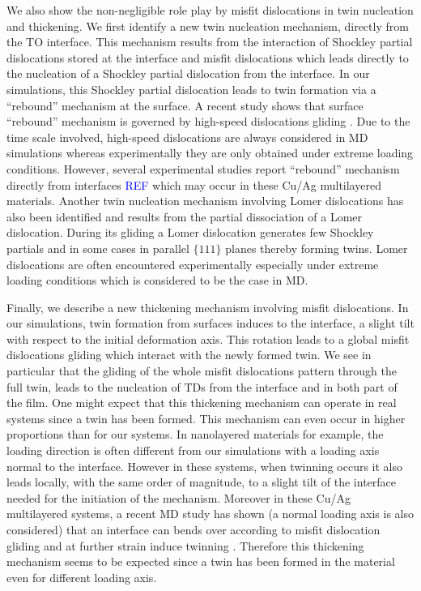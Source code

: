 \documentclass[final,3p,times,twocolumn]{elsarticle}
\begin{document}
We also show the non-negligible role play by misfit dislocations in twin nucleation and thickening. We first identify a new twin nucleation mechanism, directly from the TO interface. This mechanism results from the interaction of Shockley partial dislocations stored at the interface and misfit dislocations which leads directly to the nucleation of a Shockley partial dislocation from the interface. In our simulations, this Shockley partial dislocation leads to twin formation via a ``rebound'' mechanism at the surface. A recent study shows that surface ``rebound'' mechanism is governed by high-speed dislocations gliding \cite{li16AM}. Due to the time scale involved, high-speed dislocations are always considered in MD simulations whereas experimentally they are only obtained under extreme loading conditions. However, several experimental studies report ``rebound'' mechanism directly from interfaces \textcolor{blue}{REF} which may occur in these Cu/Ag multilayered materials. Another twin nucleation mechanism involving Lomer dislocations has also been identified and results from the partial dissociation of a Lomer dislocation. During its gliding a Lomer dislocation generates few Shockley partials and in some cases in parallel $\lbrace111\rbrace$ planes thereby forming twins. Lomer dislocations are often encountered experimentally especially under extreme loading conditions which is considered to be the case in MD.  

Finally, we describe a new thickening mechanism involving misfit dislocations. In our simulations, twin formation from surfaces induces to the interface, a slight tilt with respect to the initial deformation axis. This rotation leads to a global misfit dislocations gliding which interact with the newly formed twin. We see in particular that the gliding of the whole misfit dislocations pattern through the full twin, leads to the nucleation of TDs from the interface and in both part of the film. One might expect that this thickening mechanism can operate in real systems since a twin has been formed. This mechanism can even occur in higher proportions than for our systems. In nanolayered materials for example, the loading direction is often different from our simulations with a loading axis normal to the interface. However in these systems, when twinning occurs it also leads locally, with the same order of magnitude, to a slight tilt of the interface \cite{an15APL} needed for the initiation of the mechanism. Moreover in these Cu/Ag multilayered systems, a recent MD study has shown (a normal loading axis is also considered) that an interface can bends over according to misfit dislocation gliding and at further strain induce twinning \cite{li15PM}. Therefore this thickening mechanism seems to be expected since a twin has been formed in the material even for different loading axis. 
\end{document}

